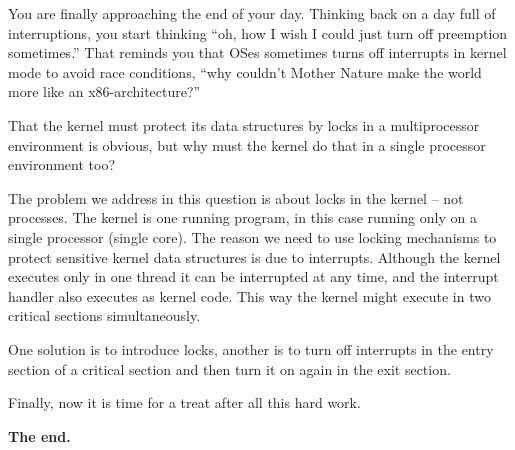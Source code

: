 \documentclass[addpoints]{miunexam}
\begin{document}
\begin{questions}


  \question[3]
  You are finally approaching the end of your day.
  Thinking back on a day full of interruptions, you start thinking ``oh, how 
  I wish I could just turn off preemption sometimes.''
  That reminds you that OSes sometimes turns off interrupts in kernel mode to 
  avoid race conditions, ``why couldn't Mother Nature make the world more like 
  an x86-architecture?''

  That the kernel must protect its data structures by locks in a multiprocessor 
  environment is obvious, but why must the kernel do that in a single processor 
  environment too?
  \begin{solution}
    The problem we address in this question is about locks in the kernel -- not 
    processes.
    The kernel is one running program, in this case running only on a single 
    processor (single core).
    The reason we need to use locking mechanisms to protect sensitive kernel 
    data structures is due to interrupts.
    Although the kernel executes only in one thread it can be interrupted at 
    any time, and the interrupt handler also executes as kernel code.
    This way the kernel might execute in two critical sections simultaneously.

    One solution is to introduce locks, another is to turn off interrupts in 
    the entry section of a critical section and then turn it on again in the 
    exit section.
  \end{solution}


\end{questions}

Finally, now it is time for a treat after all this hard work.
\begin{center}
  \textbf{The end.}
\end{center}


\end{document}
